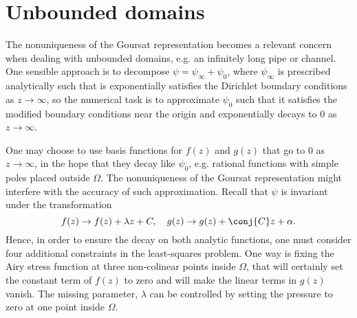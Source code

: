 
\section{Unbounded domains}
The nonuniqueness of the Goursat representation becomes a relevant concern when dealing with unbounded domains, e.g. an infinitely long pipe or channel. One sensible approach is to decompose $\psi = \psi_\infty + \psi_0$, where $\psi_\infty$ is prescribed analytically such that is exponentially satisfies the Dirichlet boundary conditions as $z\to\infty$, so the numerical task is to approximate $\psi_0$ such that it satisfies the modified boundary conditions near the origin and exponentially decays to 0 as $z\to\infty$. 

One may choose to use basis functions for $f(z)$ and $g(z)$ that go to $0$ as $z\to\infty$, in the hope that they decay like $\psi_0$, e.g. rational functions with simple poles placed outside $\Omega$. The nonuniqueness of the Goursat representation might interfere with the accuracy of such approximation. Recall that $\psi$ is invariant under the transformation
\begin{equation}
f(z) \to f(z) + \lambda z + C, \quad g(z) \to g(z) + \conj{C}z + \alpha.
\end{equation}
Hence, in order to ensure the decay on both analytic functions, one must consider four additional constraints in the least-squares problem. One way is fixing the Airy stress function at three non-colinear points inside $\Omega$, that will certainly set the constant term of $f(z)$ to zero and will make the linear terms in $g(z)$ vanish. The missing parameter, $\lambda$ can be controlled by setting the pressure to zero at one point inside $\Omega$.
